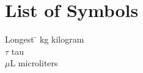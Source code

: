 

\chapter*{List of Symbols}


	

 \noindent
\vspace{-1.75\baselineskip}
  \begin{tabbing}
Longest \=  \kill 
kg \>  kilogram\\ %
$\tau$ \>tau\\
$\mu$L \> microliters\\




\end{tabbing}